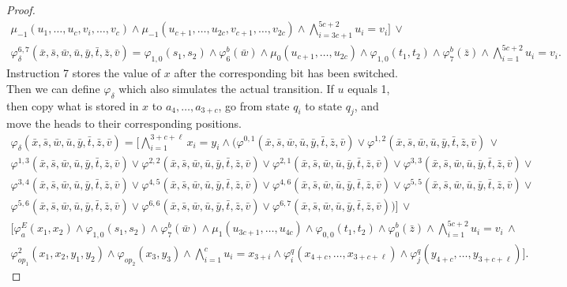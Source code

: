 \begin{proof}
\begin{multline*}
	\mu_{-1}(u_1,\ldots,u_c,v_i,\ldots,v_c) \wedge \mu_{-1}(u_{c+1},\ldots,u_{2c},v_{c+1},\ldots,v_{2c}) \wedge \bigwedge_{i = 3c+1}^{5c+2} u_i = v_i]\,\vee \\
	\varphi^{6,7}_{\delta}(\bar{x},\bar{s},\bar{w},\bar{u},\bar{y},\bar{t},\bar{z},\bar{v}) = \varphi_{1,0}(s_1,s_2) \wedge \varphi^b_6(\bar{w}) \wedge \mu_0(u_{c+1},\ldots,u_{2c}) \wedge \varphi_{1,0}(t_1,t_2) \wedge \varphi^b_7(\bar{z}) \wedge \bigwedge_{i = 1}^{5c+2} u_i = v_i.
	\end{multline*}
	Instruction 7 stores the value of $x$ after the corresponding bit has been switched. Then we can define $\varphi_{\delta}$ which also simulates the actual transition. If $u$ equals 1, then copy what is stored in $x$ to $a_4,\ldots,a_{3+c}$, go from state $q_i$ to state $q_j$, and move the heads to their corresponding positions.
	\begin{multline*}
	\varphi_{\delta}(\bar{x},\bar{s},\bar{w},\bar{u},\bar{y},\bar{t},\bar{z},\bar{v}) = 	[\bigwedge_{i = 1}^{3+c+\ell} x_i = y_i \wedge (\varphi^{0,1}(\bar{x},\bar{s},\bar{w},\bar{u},\bar{y},\bar{t},\bar{z},\bar{v}) \vee \varphi^{1,2}(\bar{x},\bar{s},\bar{w},\bar{u},\bar{y},\bar{t},\bar{z},\bar{v})\, \vee \\ \varphi^{1,3}(\bar{x},\bar{s},\bar{w},\bar{u},\bar{y},\bar{t},\bar{z},\bar{v}) \vee \varphi^{2,2}(\bar{x},\bar{s},\bar{w},\bar{u},\bar{y},\bar{t},\bar{z},\bar{v}) \vee \varphi^{2,1}(\bar{x},\bar{s},\bar{w},\bar{u},\bar{y},\bar{t},\bar{z},\bar{v}) \vee \varphi^{3,3}(\bar{x},\bar{s},\bar{w},\bar{u},\bar{y},\bar{t},\bar{z},\bar{v}) \vee \\ \varphi^{3,4}(\bar{x},\bar{s},\bar{w},\bar{u},\bar{y},\bar{t},\bar{z},\bar{v}) \vee \varphi^{4,5}(\bar{x},\bar{s},\bar{w},\bar{u},\bar{y},\bar{t},\bar{z},\bar{v}) \vee \varphi^{4,6}(\bar{x},\bar{s},\bar{w},\bar{u},\bar{y},\bar{t},\bar{z},\bar{v}) \vee \varphi^{5,5}(\bar{x},\bar{s},\bar{w},\bar{u},\bar{y},\bar{t},\bar{z},\bar{v}) \vee \\ \varphi^{5,6}(\bar{x},\bar{s},\bar{w},\bar{u},\bar{y},\bar{t},\bar{z},\bar{v}) \vee \varphi^{6,6}(\bar{x},\bar{s},\bar{w},\bar{u},\bar{y},\bar{t},\bar{z},\bar{v}) \vee \varphi^{6,7}(\bar{x},\bar{s},\bar{w},\bar{u},\bar{y},\bar{t},\bar{z},\bar{v}))] \, \vee \\
	[\varphi^E_a(x_1,x_2) \wedge \varphi_{1,0}(s_1,s_2) \wedge \varphi^b_7(\bar{w}) \wedge \mu_1(u_{3c+1},\ldots,u_{4c}) \wedge \varphi_{0,0}(t_1,t_2) \wedge \varphi^b_0(\bar{z}) \wedge \bigwedge_{i = 1}^{5c+2} u_i = v_i \,\wedge \\
	\varphi^2_{op_1}(x_1,x_2,y_1,y_2) \wedge \varphi_{op_2}(x_3,y_3) \wedge \bigwedge_{i = 1}^c u_i = x_{3+i} \wedge \varphi^q_i(x_{4+c},\ldots,x_{3+c+\ell}) \wedge \varphi^q_j(y_{4+c},\ldots,y_{3+c+\ell})].
	\end{multline*}
	

\end{proof}
